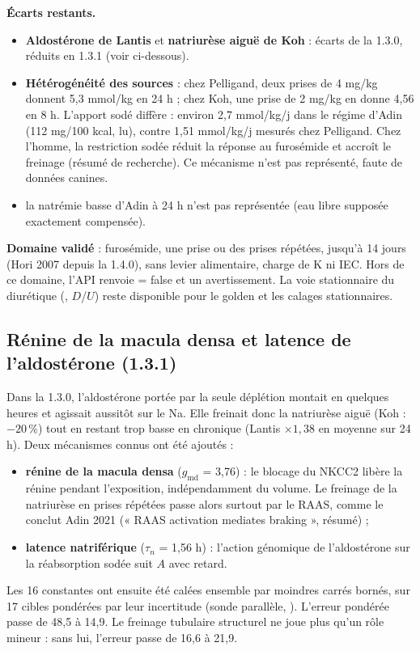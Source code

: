 \documentclass[10pt,a4paper]{article}
\newcommand{\vp}[1]{\path{#1}}
\begin{document}
\textbf{Écarts restants.}
\begin{itemize}
\item \textbf{Aldostérone de Lantis} et \textbf{natriurèse aiguë de Koh} : écarts de la 1.3.0, réduits en 1.3.1 (voir ci-dessous).
\item \textbf{Hétérogénéité des sources} : chez Pelligand, deux prises de 4 mg/kg donnent 5,3 mmol/kg en 24 h ; chez Koh, une prise de 2 mg/kg en donne 4,56 en 8 h. L'apport sodé diffère : environ 2,7 mmol/kg/j dans le régime d'Adin (112 mg/100 kcal, lu), contre 1,51 mmol/kg/j mesurés chez Pelligand. Chez l'homme, la restriction sodée réduit la réponse au furosémide et accroît le freinage (résumé de recherche). Ce mécanisme n'est pas représenté, faute de données canines.
\item la natrémie basse d'Adin à 24 h n'est pas représentée (eau libre supposée exactement compensée).
\end{itemize}

\textbf{Domaine validé} : furosémide, une prise ou des prises répétées, jusqu'à 14 jours (Hori 2007 depuis la 1.4.0), sans levier alimentaire, charge de K ni IEC. Hors de ce domaine, l'API renvoie \vp{validated} = false et un avertissement. La voie stationnaire du diurétique (\vp{pkpd::timecourse}, $D$/$U$) reste disponible pour le golden et les calages stationnaires.

\subsection{Rénine de la macula densa et latence de l'aldostérone (1.3.1)}
Dans la 1.3.0, l'aldostérone portée par la seule déplétion montait en quelques heures et agissait aussitôt sur le Na. Elle freinait donc la natriurèse aiguë (Koh : $-20$\,\%) tout en restant trop basse en chronique (Lantis $\times 1{,}38$ en moyenne sur 24 h). Deux mécanismes connus ont été ajoutés :
\begin{itemize}
\item \textbf{rénine de la macula densa} ($g_\mathrm{md}$ = 3,76) : le blocage du NKCC2 libère la rénine pendant l'exposition, indépendamment du volume. Le freinage de la natriurèse en prises répétées passe alors surtout par le RAAS, comme le conclut Adin 2021 (« RAAS activation mediates braking », résumé) ;
\item \textbf{latence natriférique} ($\tau_n$ = 1,56 h) : l'action génomique de l'aldostérone sur la réabsorption sodée suit $A$ avec retard.
\end{itemize}
Les 16 constantes ont ensuite été calées ensemble par moindres carrés bornés, sur 17 cibles pondérées par leur incertitude (sonde parallèle, \vp{PDOSE}). L'erreur pondérée passe de 48,5 à 14,9. Le freinage tubulaire structurel ne joue plus qu'un rôle mineur : sans lui, l'erreur passe de 16,6 à 21,9.
\end{document}

